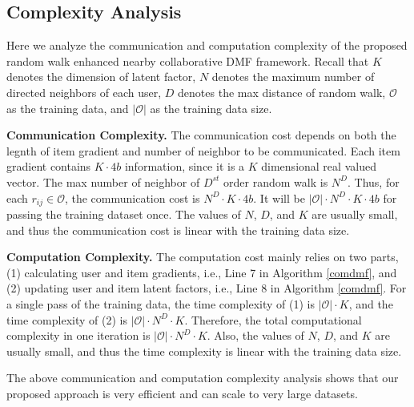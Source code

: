 \subsection{Complexity Analysis}
Here we analyze the communication and computation complexity of the proposed random walk enhanced nearby collaborative DMF framework. 
Recall that $K$ denotes the dimension of latent factor, $N$ denotes the maximum number of directed neighbors of each user, $D$ denotes the max distance of random walk, $\mathcal{O}$ as the training data, and $|\mathcal{O}|$ as the training data size. 

\textbf{Communication Complexity. }
The communication cost depends on both the legnth of item gradient and number of neighbor to be communicated. 
Each item gradient contains $K \cdot 4b$ information, since it is a $K$ dimensional real valued vector. 
The max number of neighbor of $D^{st}$ order random walk is $N^D$. 
Thus, for each $r_{ij} \in \mathcal{O}$, the communication cost is $N^D \cdot K \cdot 4b$. 
It will be $|\mathcal{O}| \cdot N^D \cdot K \cdot 4b$ for passing the training dataset once. 
The values of $N$, $D$, and $K$ are usually small, and thus the communication cost is linear with the training data size. 

\textbf{Computation Complexity. }
The computation cost mainly relies on two parts, (1) calculating user and item gradients, i.e., Line 7 in Algorithm \ref{comdmf}, and (2) updating user and item latent factors, i.e., Line 8 in Algorithm \ref{comdmf}. 
For a single pass of the training data, the time complexity of (1) is $|\mathcal{O}| \cdot K$, and the time complexity of (2) is $|\mathcal{O}| \cdot N^D \cdot K$. 
Therefore, the total computational complexity in one iteration is $|\mathcal{O}| \cdot N^D \cdot K$. 
Also, the values of $N$, $D$, and $K$ are usually small, and thus the time complexity is linear with the training data size. 

The above communication and computation complexity analysis shows that our proposed approach is very efficient and can scale to very large datasets. 

